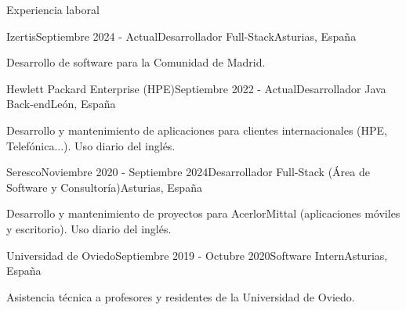 \documentclass{resume} %
\begin{document}


\begin{rSection}{Experiencia laboral}


\begin{rSubsection}{Izertis}{Septiembre 2024 - Actual}{Desarrollador Full-Stack}{Asturias, España}
\item Desarrollo de software para la Comunidad de Madrid.
\end{rSubsection}

\begin{rSubsection}{Hewlett Packard Enterprise (HPE)}{Septiembre 2022 - Actual}{Desarrollador Java Back-end}{León, España}
\item Desarrollo y mantenimiento de aplicaciones para clientes internacionales (HPE, Telefónica...). Uso diario del inglés.
\end{rSubsection}

\begin{rSubsection}{Seresco}{Noviembre 2020 - Septiembre 2024}{Desarrollador Full-Stack (Área de Software y Consultoría)}{Asturias, España}
\item Desarrollo y mantenimiento de proyectos para AcerlorMittal (aplicaciones móviles y escritorio). Uso diario del inglés.
\end{rSubsection}

\begin{rSubsection}{Universidad de Oviedo}{Septiembre 2019 - Octubre 2020}{Software Intern}{Asturias, España}
\item Asistencia técnica a profesores y residentes de la Universidad de Oviedo.
\end{rSubsection}

\end{rSection}

\end{document}
